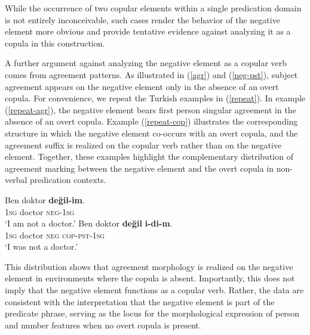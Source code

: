 \documentclass[10pt, a4paper]{article}
\newcommand{\gl}[1]{\textsc{#1}}
\begin{document}

While the occurrence of two copular elements within a single predication domain is not entirely inconceivable, such cases render the behavior of the negative element more obvious and provide tentative evidence against analyzing it as a copula in this construction.

A further argument against analyzing the negative element as a copular verb comes from agreement patterns.
As illustrated in (\ref{agr}) and (\ref{neg-pst}), subject agreement appears on the negative element only in the absence of an overt copula. For convenience, we repeat the Turkish examples in (\ref{repeat}). In example (\ref{repeat-agr}), the negative element bears first person singular agreement in the absence of an overt copula. Example (\ref{repeat-cop}) illustrates the corresponding structure in which the negative element co-occurs with an overt copula, and the agreement suffix is realized on the copular verb rather than on the negative element. Together, these examples highlight the complementary distribution of agreement marking between the negative element and the overt copula in non-verbal predication contexts.

\begin{exe}
  \ex\label{repeat}
  \begin{xlist}
    \ex\label{repeat-agr}
    \gll Ben doktor \textbf{değil-im}.\\
    1\gl{sg} doctor \gl{neg}-1\gl{sg}\\
    \glt `I am not a doctor.'
    \ex\label{repeat-cop}
    \gll Ben doktor \textbf{değil} \textbf{i-di-m}.\\
    1\gl{sg} doctor \gl{neg} \gl{cop}-\gl{pst}-1\gl{sg}\\
    \glt `I was not a doctor.'

  \end{xlist}
\end{exe}

This distribution shows that agreement morphology is realized on the negative element in environments where the copula is absent. Importantly, this does not imply that the negative element functions as a copular verb. Rather, the data are consistent with the interpretation that the negative element is part of the predicate phrase, serving as the locus for the morphological expression of person and number features when no overt copula is present.
\end{document}
